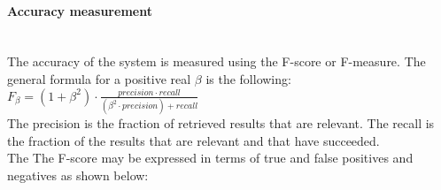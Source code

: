 



		\paragraph{Accuracy measurement}\mbox{}\\


		The accuracy of the system is measured using the F-score or F-measure. 
		The general formula for a positive real $\beta$ is the following: 
		\\

		$F_\beta=(1+\beta^2)\cdot\frac{precision \cdot recall}{(\beta^2 \cdot precision )+recall}$
		\\

		The precision is the fraction of retrieved results that are relevant.  
		The recall is the fraction of the results that are relevant and that have succeeded. 
		\\
		The 
		The F-score may be expressed in terms of true and false positives and negatives as shown below: 
		\\


